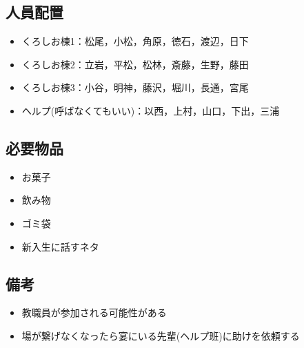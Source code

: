 \subsection{人員配置}
\begin{itemize}
 \item くろしお棟1：松尾，小松，角原，徳石，渡辺，日下
 \item くろしお棟2：立岩，平松，松林，斎藤，生野，藤田
 \item くろしお棟3：小谷，明神，藤沢，堀川，長通，宮尾
 \item ヘルプ(呼ばなくてもいい)：以西，上村，山口，下出，三浦
\end{itemize}

\subsection{必要物品}
\begin{itemize}
  \item お菓子
  \item 飲み物
  \item ゴミ袋
  \item 新入生に話すネタ
\end{itemize}

\subsection{備考}
\begin{itemize}
  \item 教職員が参加される可能性がある
  \item 場が繋げなくなったら宴にいる先輩(ヘルプ班)に助けを依頼する
\end{itemize}


%
